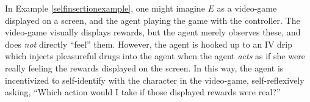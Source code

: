 \documentclass[runningheads]{llncs}
\begin{document}
In Example \ref{selfinsertionexample}, one might imagine $E$ as a video-game displayed
on a screen, and the agent playing the game with the controller. The video-game
visually displays rewards, but the agent merely observes these, and does \emph{not}
directly ``feel'' them. However, the agent is hooked up to an IV drip which injects
pleasureful drugs into the agent when the agent \emph{acts} as if she were really
feeling the rewards displayed on the screen. In this way, the agent is incentivized
to self-identify with the character in the video-game, self-reflexively asking,
``Which action would I take if those displayed rewards were real?''





\end{document}
